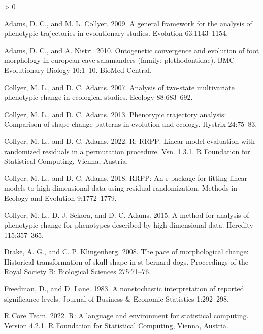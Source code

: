 \documentclass[
]{article}
\newlength{\cslhangindent}
\newenvironment{CSLReferences}[2] %
 {%
  \setlength{\parindent}{0pt}
  \ifodd #1 \everypar{\setlength{\hangindent}{\cslhangindent}}\ignorespaces\fi
  \ifnum #2 > 0
  \setlength{\parskip}{#2\baselineskip}
  \fi
 }%
 {}
\begin{document}
\hypertarget{refs}{}
\begin{CSLReferences}{1}{0}
\leavevmode\hypertarget{ref-AdamsCollyer2009}{}%
Adams, D. C., and M. L. Collyer. 2009. A general framework for the
analysis of phenotypic trajectories in evolutionary studies. Evolution
63:1143--1154.

\leavevmode\hypertarget{ref-AdamsNistri2010}{}%
Adams, D. C., and A. Nistri. 2010. Ontogenetic convergence and evolution
of foot morphology in european cave salamanders (family:
plethodontidae). BMC Evolutionary Biology 10:1--10. BioMed Central.

\leavevmode\hypertarget{ref-CollyerAdams2007}{}%
Collyer, M. L., and D. C. Adams. 2007. Analysis of two-state
multivariate phenotypic change in ecological studies. Ecology
88:683--692.

\leavevmode\hypertarget{ref-CollyerAdams2013}{}%
Collyer, M. L., and D. C. Adams. 2013. Phenotypic trajectory analysis:
Comparison of shape change patterns in evolution and ecology. Hystrix
24:75--83.

\leavevmode\hypertarget{ref-RRPP}{}%
Collyer, M. L., and D. C. Adams. 2022. R: RRPP: Linear model evaluation
with randomized residuals in a permutation procedure. Vsn. 1.3.1. R
Foundation for Statistical Computing, Vienna, Austria.

\leavevmode\hypertarget{ref-CollyerAdams2018}{}%
Collyer, M. L., and D. C. Adams. 2018. RRPP: An r package for fitting
linear models to high-dimensional data using residual randomization.
Methods in Ecology and Evolution 9:1772--1779.

\leavevmode\hypertarget{ref-Collyer_et_al2015}{}%
Collyer, M. L., D. J. Sekora, and D. C. Adams. 2015. A method for
analysis of phenotypic change for phenotypes described by
high-dimensional data. Heredity 115:357--365.

\leavevmode\hypertarget{ref-DrakeKlingenberg2008}{}%
Drake, A. G., and C. P. Klingenberg. 2008. The pace of morphological
change: Historical transformation of skull shape in st bernard dogs.
Proceedings of the Royal Society B: Biological Sciences 275:71--76.

\leavevmode\hypertarget{ref-Freedman1983}{}%
Freedman, D., and D. Lane. 1983. A nonstochastic interpretation of
reported significance levels. Journal of Business {\&} Economic
Statistics 1:292--298.

\leavevmode\hypertarget{ref-RCT}{}%
R Core Team. 2022. R: A language and environment for statistical
computing. Version 4.2.1. R Foundation for Statistical Computing,
Vienna, Austria.


\end{CSLReferences}
\end{document}
